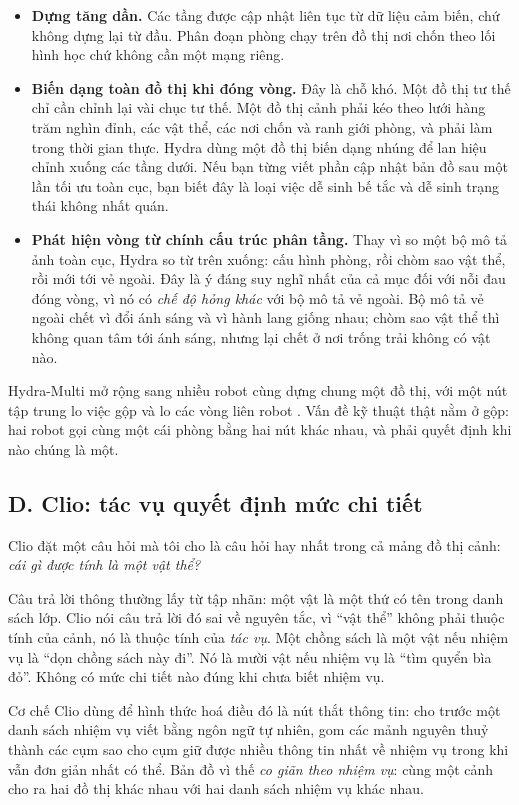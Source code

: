 \documentclass[../../deep_learning.tex]{subfiles}
\begin{document}
\begin{itemize}
\item \textbf{Dựng tăng dần.} Các tầng được cập nhật liên tục từ dữ liệu cảm biến, chứ không dựng lại từ đầu. Phân đoạn phòng chạy trên đồ thị nơi chốn theo lối hình học chứ không cần một mạng riêng.
\item \textbf{Biến dạng toàn đồ thị khi đóng vòng.} Đây là chỗ khó. Một đồ thị tư thế chỉ cần chỉnh lại vài chục tư thế. Một đồ thị cảnh phải kéo theo lưới hàng trăm nghìn đỉnh, các vật thể, các nơi chốn và ranh giới phòng, và phải làm trong thời gian thực. Hydra dùng một đồ thị biến dạng nhúng để lan hiệu chỉnh xuống các tầng dưới. Nếu bạn từng viết phần cập nhật bản đồ sau một lần tối ưu toàn cục, bạn biết đây là loại việc dễ sinh bế tắc và dễ sinh trạng thái không nhất quán.
\item \textbf{Phát hiện vòng từ chính cấu trúc phân tầng.} Thay vì so một bộ mô tả ảnh toàn cục, Hydra so từ trên xuống: cấu hình phòng, rồi chòm sao vật thể, rồi mới tới vẻ ngoài. Đây là ý đáng suy nghĩ nhất của cả mục đối với nỗi đau đóng vòng, vì nó có \emph{chế độ hỏng khác} với bộ mô tả vẻ ngoài. Bộ mô tả vẻ ngoài chết vì đổi ánh sáng và vì hành lang giống nhau; chòm sao vật thể thì không quan tâm tới ánh sáng, nhưng lại chết ở nơi trống trải không có vật nào.
\end{itemize}

Hydra-Multi mở rộng sang nhiều robot cùng dựng chung một đồ thị, với một nút tập trung lo việc gộp và lo các vòng liên robot \cite{chang2023hydramulti}. Vấn đề kỹ thuật thật nằm ở gộp: hai robot gọi cùng một cái phòng bằng hai nút khác nhau, và phải quyết định khi nào chúng là một.

\subsection{D. Clio: tác vụ quyết định mức chi tiết}
Clio đặt một câu hỏi mà tôi cho là câu hỏi hay nhất trong cả mảng đồ thị cảnh: \emph{cái gì được tính là một vật thể?} \cite{maggio2024clio}

Câu trả lời thông thường lấy từ tập nhãn: một vật là một thứ có tên trong danh sách lớp. Clio nói câu trả lời đó sai về nguyên tắc, vì ``vật thể'' không phải thuộc tính của cảnh, nó là thuộc tính của \emph{tác vụ}. Một chồng sách là một vật nếu nhiệm vụ là ``dọn chồng sách này đi''. Nó là mười vật nếu nhiệm vụ là ``tìm quyển bìa đỏ''. Không có mức chi tiết nào đúng khi chưa biết nhiệm vụ.

Cơ chế Clio dùng để hình thức hoá điều đó là nút thắt thông tin: cho trước một danh sách nhiệm vụ viết bằng ngôn ngữ tự nhiên, gom các mảnh nguyên thuỷ thành các cụm sao cho cụm giữ được nhiều thông tin nhất về nhiệm vụ trong khi vẫn đơn giản nhất có thể. Bản đồ vì thế \emph{co giãn theo nhiệm vụ}: cùng một cảnh cho ra hai đồ thị khác nhau với hai danh sách nhiệm vụ khác nhau.
\end{document}
